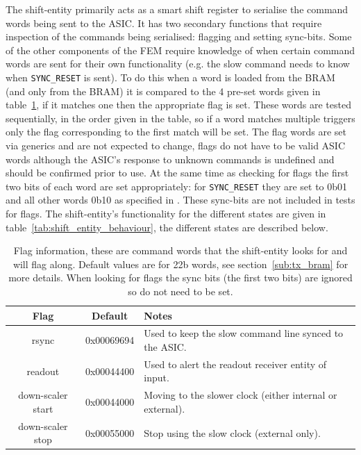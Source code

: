 The shift-entity primarily acts as a smart shift register to serialise the command words being sent to the ASIC. It has two secondary functions that require inspection of the commands being serialised: flagging and setting sync-bits. Some of the other components of the FEM require knowledge of when certain command words are sent for their own functionality (e.g. the slow command needs to know when \texttt{SYNC\_RESET} is sent). To do this when a word is loaded from the BRAM (and only from the BRAM) it is compared to the 4 pre-set words given in table~\ref{tab:shift_entity_flags}, if it matches one then the appropriate flag is set. These words are tested sequentially, in the order given in the table, so if a word matches multiple triggers only the flag corresponding to the first match will be set. The flag words are set via generics and are not expected to change, flags do not have to be valid ASIC words although the ASIC's response to unknown commands is undefined and should be confirmed prior to use. At the same time as checking for flags the first two bits of each word are set appropriately: for \texttt{SYNC\_RESET} they are set to 0b01 and all other words 0b10 as specified in \cite{lpd_manual}. These sync-bits are not included in tests for flags. The shift-entity's functionality for the different states are given in table~\ref{tab:shift_entity_behaviour}, the different states are described below.

\begin{table}
  \begin{center}
    \begin{tabular}{c|c|l}
      Flag             & Default    & Notes \\
      \hline
      rsync             & 0x00069694 & Used to keep the slow command line synced to the ASIC.   \\
      readout           & 0x00044400 & Used to alert the readout receiver entity of input.       \\
      down-scaler start & 0x00044000 & Moving to the slower clock (either internal or external).\\
      down-scaler stop  & 0x00055000 & Stop using the slow clock (external only).               \\
    \end{tabular}
  \end{center}
  \caption{Flag information, these are command words that the shift-entity looks for and will flag along. Default values are for 22b words, see section~\ref{sub:tx_bram} for more details. When looking for flags the sync bits (the first two bits) are ignored so do not need to be set.}
  \label{tab:shift_entity_flags}
\end{table}
    
